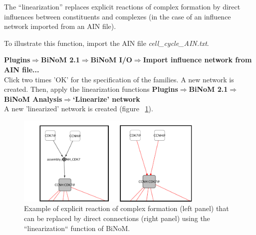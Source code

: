 The ``linearization'' replaces explicit reactions of complex formation by direct influences between constituents and complexes (in the case of an influence network imported from an AIN file).

To illustrate this function, import the AIN file \textit{cell\_cycle\_AIN.txt}.

\textbf{Plugins$\Rightarrow$BiNoM 2.1$\Rightarrow$BiNoM I/O$\Rightarrow$Import influence network from AIN file...}\\
Click two times 'OK' for the specification of the families. A new network is created. Then, apply the linearization functions
\textbf{Plugins$\Rightarrow$BiNoM 2.1$\Rightarrow$BiNoM Analysis$\Rightarrow$‘Linearize’ network}\\

A new 'linearized' network is created (figure ~\ref{Linearized_Network_Cell_Cycle}).

\begin{figure}
  \centering
  \includegraphics[width=0.8\textwidth]{graphics/linearize_cc.pdf}
  \caption{Example of explicit reaction of complex formation (left panel) that can be replaced by direct connections (right panel) using the ``linearization`` function of BiNoM.}
  \label{Linearized_Network_Cell_Cycle}
\end{figure}


